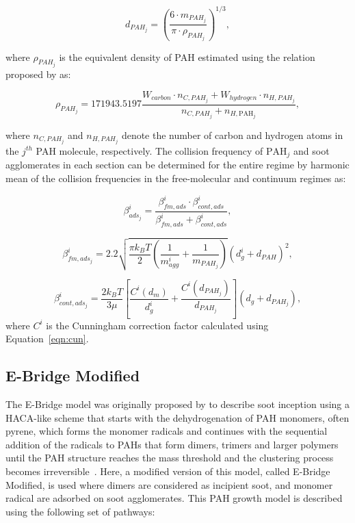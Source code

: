 \begin{equation}
	d_{PAH_j}=
	\left(
		\frac{6\cdot m_{{PAH}_j}}{\pi\cdot\rho_{{PAH}_j}}
	\right)^{1/3},
	\label{eqn:dPAH}
\end{equation}

\noindent where $\rho_{PAH_j}$ is the equivalent density of PAH estimated using the relation proposed by \citet{johansson2016formation} as:

\begin{equation}
	\rho_{PAH_j}= 
	171943.5197
	\frac{W_{carbon}\cdot n_{C,{PAH}_j}+W_{hydrogen}\cdot n_{H,{PAH}_j}}
	{n_{C,{PAH}_j}+n_{H,\mathrm{PAH}_j}},
	\label{eqn:rhoPAH}
\end{equation}

\noindent where ${n_{C,{PAH}_j}}$ and ${n_{H,{PAH}_j}}$ denote the number of carbon and hydrogen atoms in the $j^{th}$ PAH molecule, respectively. The collision frequency of $\mathrm{PAH}_j$ and soot agglomerates in each section can be determined for the entire regime by harmonic mean of the collision frequencies in the free-molecular and continuum regimes as:

\begin{equation}
	\beta^i_{ads_j}=
	\frac{\beta^i_{fm, ads}\cdot \beta^i_{cont, ads}}
	{\beta^i_{fm, ads}+\beta^i_{cont, ads}},
	\label{eqn:betahmads}
\end{equation}

\begin{equation}
	\beta^i_{fm, ads_j}=
	2.2 
	\sqrt{
		\frac{\pi k_B T}{2}\left(\frac{1}{m^i_{agg}}+\frac{1}{m_{PAH_j}}\right)
	}
	\left(d^i_g+d_{PAH}\right)^2,
	\label{eqn:betafmads}
\end{equation}

\begin{equation}
	\beta^i_{cont, ads_j}=
		\frac{2 k_B T}{3 \mu}
		\left[
			\frac{C^i\left(d_m\right)}{d^i_g}+
			\frac{C^i\left(d_{PAH_j}\right)}{d_{PAH_j}}
		\right]
		\left(d_g+d_{PAH_j}\right),
	\label{eqn:betacontads}
\end{equation}
where $C^i$ is the Cunningham correction factor calculated using Equation~\eqref{eqn:cun}.

\subsection{E-Bridge Modified}
\label{sec:ebrimod}
The E-Bridge model was originally proposed by \citet{frenklach2020mechanism} to describe soot inception using a HACA-like scheme that starts with the dehydrogenation of PAH monomers, often pyrene, which forms the monomer radicals and continues with the sequential addition of the radicals to PAHs that form dimers, trimers and larger polymers until the PAH structure reaches the mass threshold and the clustering process becomes irreversible~\citep{frenklach2020mechanism}. Here, a modified version of this model, called E-Bridge Modified, is used where dimers are considered as incipient soot, and monomer radical are adsorbed on soot agglomerates. This PAH growth model is described using the following set of pathways:

